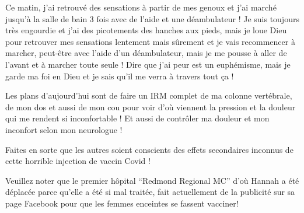 {Ce matin, j'ai retrouvé des sensations à partir de mes genoux et j'ai marché
jusqu'à la salle de bain 3 fois avec de l'aide et une déambulateur ! Je suis
toujours très engourdie et j'ai des picotements des hanches aux pieds, mais je
loue Dieu pour retrouver mes sensations lentement mais sûrement et je vais
recommencer à marcher, peut-être avec l'aide d'un déambulateur, mais je me
pousse à aller de l'avant et à marcher toute seule ! Dire que j'ai peur est un
euphémisme, mais je garde ma foi en Dieu et je sais qu'il me verra à travers
tout ça !

Les plans d'aujourd'hui sont de faire un IRM complet de ma colonne vertébrale,
de mon dos et aussi de mon cou pour voir d'où viennent la pression et la douleur
qui me rendent si inconfortable ! Et aussi de contrôler ma douleur et mon
inconfort selon mon neurologue !

Faites en sorte que les autres soient conscients des effets secondaires inconnus de cette horrible injection de vaccin Covid !

Veuillez noter que le premier hôpital “Redmond Regional MC” d'où Hannah a été
déplacée parce qu'elle a été si mal traitée, fait actuellement de la publicité
sur sa page Facebook pour que les femmes enceintes se fassent vacciner!

}
